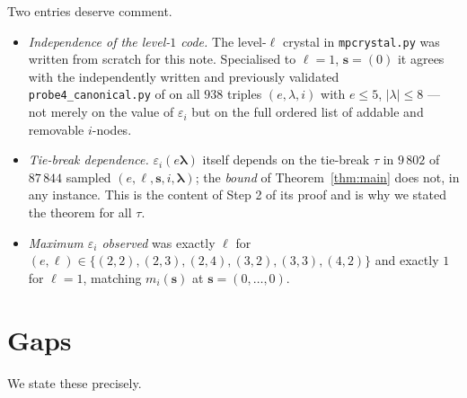 \documentclass[11pt]{article}
\theoremstyle{definition}
\newcommand{\eps}{\varepsilon}
\newcommand{\bs}{\mathbf{s}}
\newcommand{\blam}{\boldsymbol{\lambda}}
\begin{document}
Two entries deserve comment.
\begin{itemize}
\item \emph{Independence of the level-$1$ code.} The level-$\ell$ crystal in
\verb|mpcrystal.py| was written from scratch for this note. Specialised to
$\ell = 1$, $\bs = (0)$ it agrees with the independently written and
previously validated \verb|probe4_canonical.py| of
\cite{Clio-C5-2026-08-11} on all $938$ triples $(e,\lambda,i)$ with
$e \le 5$, $|\lambda| \le 8$ --- not merely on the value of $\eps_i$ but on
the full ordered list of addable and removable $i$-nodes.
\item \emph{Tie-break dependence.} $\eps_i(e\blam)$ itself depends on the
tie-break $\tau$ in $9\,802$ of $87\,844$ sampled $(e,\ell,\bs,i,\blam)$;
the \emph{bound} of Theorem~\ref{thm:main} does not, in any instance. This
is the content of Step 2 of its proof and is why we stated the theorem for
all $\tau$.
\item \emph{Maximum $\eps_i$ observed} was exactly $\ell$ for
$(e,\ell) \in \{(2,2),(2,3),(2,4),(3,2),(3,3),(4,2)\}$ and exactly $1$ for
$\ell = 1$, matching $m_i(\bs)$ at $\bs = (0,\dots,0)$.
\end{itemize}

\section{Gaps}\label{sec:gaps}

We state these precisely.
\end{document}
